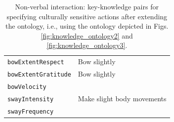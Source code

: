 \documentclass{CSSRforAfrica}
\begin{document}
\begin{table}[H]
\begin{center}
\begin{tabular}{|l l|}
{\footnotesize \verb+bowExtentRespect+} 	                        & {\footnotesize \verb++ Bow slightly} \vspace{-1.01mm}\\
{\footnotesize \verb+bowExtentGratitude+} 	                        & {\footnotesize \verb++  Bow slightly} \vspace{-1.01mm}\\
{\footnotesize \verb+bowVelocity+}                       & {\footnotesize \verb++} \vspace{-1.01mm}\\
{\footnotesize \verb+swayIntensity+} 	                & {\footnotesize \verb++ Make slight body movements} \vspace{-1.01mm}\\
{\footnotesize \verb+swayFrequency+} 	                & {\footnotesize \verb++} \\
\hline \hline
\end{tabular}
\end{center}
\vspace{-6mm}
\caption{Non-verbal interaction: key-knowledge pairs for specifying culturally sensitive actions after extending the ontology, i.e., using the ontology depicted in Figs. \ref{fig:knowledge_ontology2} and \ref{fig:knowledge_ontology3}.}
\label{table:key-knowledge_pairs3}
\end{table}
\clearpage
 
 
\end{document}
